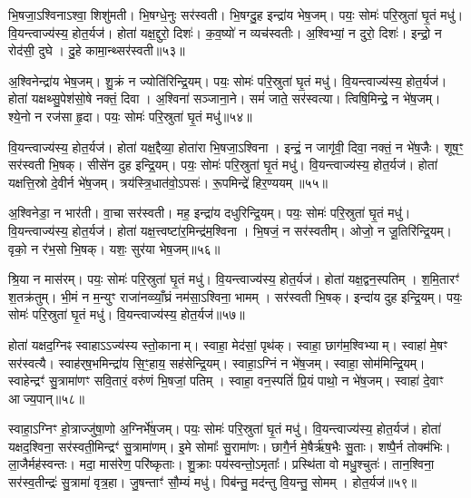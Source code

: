 भि॒षजा॒\-ऽश्विना\-ऽश्वा॒ शिशु॑मती।
भि॒षग्धे॒नुः सर॑स्वती।
भि॒षग्दु॒ह इन्द्रा॑य भेष॒जम्।
पयः॒ सोमः॑ परि॒स्रुता॑ घृ॒तं मधु॑।
वि॒यन्त्वाज्य॑स्य॒ होत॒र्यज॑।
होता॑ यक्ष॒द्दुरो॒ दिशः॑।
क॒व॒ष्यो॑ न व्यच॑स्वतीः।
अ॒श्विभ्यां॒ न दुरो॒ दिशः॑।
इन्द्रो॒ न रोद॑सी॒ दुघे।
दु॒हे कामा॒न्थ्सर॑स्वती॥५३॥

अ॒श्विनेन्द्रा॑य भेष॒जम्।
शु॒क्रं न ज्योति॑रिन्द्रि॒यम्।
पयः॒ सोमः॑ परि॒स्रुता॑ घृ॒तं मधु॑।
वि॒यन्त्वाज्य॑स्य॒ होत॒र्यज॑।
होता॑ यक्षथ्सु॒पेश॑सो॒षे नक्तं॒ दिवा।
अ॒श्विना॑ सञ्जाना॒ने।
समं॑ जाते॒ सर॑स्वत्या।
त्विषि॒मिन्द्रे॒ न भे॑ष॒जम्।
श्ये॒नो न रज॑सा हृ॒दा।
पयः॒ सोमः॑ परि॒स्रुता॑ घृ॒तं मधु॑॥५४॥

वि॒यन्त्वाज्य॑स्य॒ होत॒र्यज॑।
होता॑ यक्ष॒द्दैव्या॒ होता॑रा भि॒षजा॒\-ऽश्विना।
इन्द्रं॒ न जागृ॑वी॒ दिवा॒ नक्तं॒ न भे॑ष॒जैः।
शूष॒ꣳ॒ सर॑स्वती भि॒षक्।
सीसे॑न दुह इन्द्रि॒यम्।
पयः॒ सोमः॑ परि॒स्रुता॑ घृ॒तं मधु॑।
वि॒यन्त्वाज्य॑स्य॒ होत॒र्यज॑।
होता॑ यक्षत्ति॒स्रो दे॒वीर्न भे॑ष॒जम्।
त्रय॑स्त्रि॒धात॑वो॒\-ऽपसः॑।
रू॒पमिन्द्रे॑ हिर॒ण्ययम्॥५५॥

अ॒श्विनेडा॒ न भार॑ती।
वा॒चा सर॑स्वती।
मह॒ इन्द्रा॑य दधुरिन्द्रि॒यम्।
पयः॒ सोमः॑ परि॒स्रुता॑ घृ॒तं मधु॑।
वि॒यन्त्वाज्य॑स्य॒ होत॒र्यज॑।
होता॑ यक्ष॒त्त्वष्टा॑र॒मिन्द्र॑म॒श्विना।
भि॒षजं॒ न सर॑स्वतीम्।
ओजो॒ न जू॒तिरि॑न्द्रि॒यम्।
वृको॒ न र॑भ॒सो भि॒षक्।
यशः॒ सुर॑या भेष॒जम्॥५६॥

श्रि॒या न मास॑रम्।
पयः॒ सोमः॑ परि॒स्रुता॑ घृ॒तं मधु॑।
वि॒यन्त्वाज्य॑स्य॒ होत॒र्यज॑।
होता॑ यक्ष॒द्वन॒स्पतिम्।
श॒मि॒तारꣳ॑ श॒तक्र॑तुम्।
भी॒मं न म॒न्युꣳ राजा॑नव्व्याँ॒घ्रं नम॑सा॒\-ऽश्विना॒ भामम्।
सर॑स्वती भि॒षक्।
इन्दा॑य दुह इन्द्रि॒यम्।
पयः॒ सोमः॑ परि॒स्रुता॑ घृ॒तं मधु॑।
वि॒यन्त्वाज्य॑स्य॒ होत॒र्यज॑॥५७॥

होता॑ यक्षद॒ग्निꣴ स्वाहा\-ऽऽज्य॑स्य स्तो॒कानाम्।
स्वाहा॒ मेद॑सां॒ पृथ॑क्।
स्वाहा॒ छाग॑म॒श्विभ्याम्।
स्वाहा॑ मे॒षꣳ सर॑स्वत्यै।
स्वाह॑र्‌\mbox{}ष॒भमिन्द्रा॑य सि॒ꣳ॒हाय॒ सह॑सेन्द्रि॒यम्।
स्वाहा॒\-ऽग्निं न भे॑ष॒जम्।
स्वाहा॒ सोम॑मिन्द्रि॒यम्।
स्वाहेन्द्रꣳ॑ सु॒त्रामा॑णꣳ सवि॒तारं॒ वरु॑णं भि॒षजां॒ पतिम्।
स्वाहा॒ वन॒स्पतिं॑ प्रि॒यं पाथो॒ न भे॑ष॒जम्।
स्वाहा॑ दे॒वाꣳ आज्य॒पान्॥५८॥

स्वाहा॒\-ऽग्निꣳ हो॒त्राज्जु॑षा॒णो अ॒ग्निर्भे॑ष॒जम्।
पयः॒ सोमः॑ परि॒स्रुता॑ घृ॒तं मधु॑।
वि॒यन्त्वाज्य॑स्य॒ होत॒र्यज॑।
होता॑ यक्षद॒श्विना॒ सर॑स्वती॒मिन्द्रꣳ॑ सु॒त्रामा॑णम्।
इ॒मे सोमाः᳚ सु॒रामा॑णः।
छागै॒र्न मे॒षैर्\mbox{}ऋ॑ष॒भैः सु॒ताः।
शष्पै॒र्न तोक्म॑भिः।
ला॒जैर्मह॑स्वन्तः।
मदा॒ मास॑रेण॒ परि॑ष्कृताः।
शु॒क्राः पय॑स्वन्तो॒\-ऽमृताः᳚।
प्रस्थि॑ता वो मधु॒श्चुतः॑।
तान॒श्विना॒ सर॑स्व॒तीन्द्रः॑ सु॒त्रामा॑ वृत्र॒हा।
जु॒षन्ताꣳ॑ सौ॒म्यं मधु॑।
पिब॑न्तु॒ मद॑न्तु वि॒यन्तु॒ सोमम्।
होत॒र्यज॑॥५९॥


